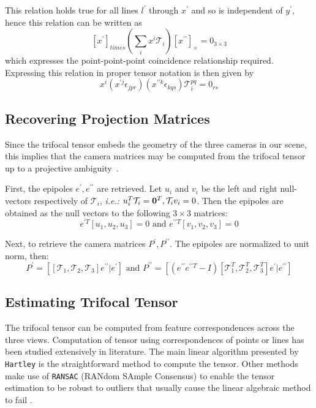 This relation holds true for all lines $l^{\prime}$ through $x^{\prime}$ and so is independent of $y^{\prime}$, hence this relation can be written as
$$
[x^{\prime}]_{times} (\sum_{i} x^{i}\mathcal{T}_{i})[x^{\prime \prime}]_{\times} = 0_{3\times 3}
$$
which expresses the point-point-point coincidence relationship required. Expressing this relation in proper tensor notation is then given by
\begin{equation}
  x^{i}(x^{\prime j} \epsilon_{jpr})(x^{\prime \prime k} \epsilon_{kqs})\mathcal{T}^{pq}_{i} = 0_{rs} \label{eq:trifocalgeometry3}
\end{equation}

\subsection{Recovering Projection Matrices}
\label{sub:recovering_projection_matrices}
Since the trifocal tensor embeds the geometry of the three cameras in our scene, this implies that the camera matrices may be computed from the trifocal tensor up to a projective ambiguity~\cite{Hartley2004}.

First, the epipoles $e^{\prime},e^{\prime \prime}$ are retrieved. Let $u_i$ and $v_i$ be the left and right null-vectors respectively of $\mathcal{T}_{i}$, \textit{i.e.:} $u_{i}^{T} \mathcal{T}_{i} = {\bf 0}^{T}, \mathcal{T}_{i}v_i = 0$. Then the epipoles are obtained as the null vectors to the following $ 3 \times 3$ matrices:
\begin{equation}
  e^{\prime T} [u_1, u_2, u_3] = 0  \text{ and } e^{\prime \prime T}[v_1, v_2, v_3] = 0
  \label{eq:recoveringepipoles}
\end{equation}

Next, to retrieve the camera matrices $P^{\prime}, P^{\prime \prime}$. The epipoles are normalized to unit norm, then:
\begin{equation}
  P^{\prime} = [[\mathcal{T}_{1}, \mathcal{T}_{2},\mathcal{T}_{3}] e^{\prime \prime} | e^{\prime}] \text{ and } P^{\prime \prime} = [(e^{\prime \prime} e^{\prime \prime T} - I)[\mathcal{T}_{1}^{T}, \mathcal{T}_{2}^{T},\mathcal{T}_{3}^{T}] e^{\prime} | e^{\prime \prime}]
\end{equation}

\subsection{Estimating Trifocal Tensor}
The trifocal tensor can be computed from feature correspondences across the three views. Computation of tensor using correspondences of points or lines has been studied extensively in literature. The main linear algorithm presented by \texttt{Hartley}\cite{Hartley2004} is the straightforward method to compute the tensor. Other methods make use of \texttt{RANSAC} (RANdom SAmple Consensus) to enable the tensor estimation to be robust to outliers that usually cause the linear algebraic method to fail \cite{torr1997robust}.

